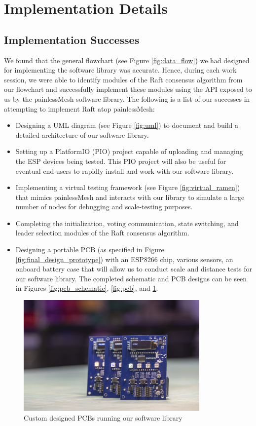 \section{Implementation Details}

\subsection{Implementation Successes}
We found that the general flowchart (see Figure \ref{fig:data_flow}) we had designed for implementing the software library was accurate. Hence, during each work session, we were able to identify modules of the Raft consensus algorithm from our flowchart and successfully implement these modules using the API exposed to us by the painlessMesh software library. The following is a list of our successes in attempting to implement Raft atop painlessMesh:

\begin{itemize}
  \item Designing a UML diagram (see Figure \ref{fig:uml}) to document and build a detailed architecture of our software library.
  \item Setting up a PlatformIO (PIO) project capable of uploading and managing the ESP devices being tested. This PIO project will also be useful for eventual end-users to rapidly install and work with our software library.
  \item Implementing a virtual testing framework (see Figure \ref{fig:virtual_ramen}) that mimics painlessMesh and interacts with our library to simulate a large number of nodes for debugging and scale-testing purposes.
  \item Completing the initialization, voting communication, state switching, and leader selection modules of the Raft consensus algorithm.
  \item Designing a portable PCB (as specified in Figure \ref{fig:final_design_prototype}) with an ESP8266 chip, various sensors, an onboard battery case that will allow us to conduct scale and distance tests for our software library. The completed schematic and PCB designs can be seen in Figures \ref{fig:pcb_schematic}, \ref{fig:pcb}, and \ref{fig:ramen_photo}.
\end{itemize}

\begin{figure}[H]
    \centering
    \includegraphics[width=0.84\textwidth]{images/ramen_photo.jpg}
    \caption{Custom designed PCBs running our software library}
    \label{fig:ramen_photo}
\end{figure}

